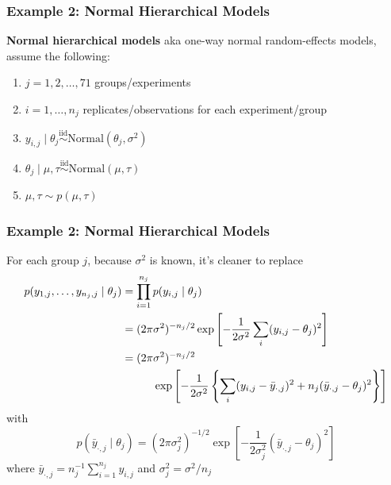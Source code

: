 \documentclass{beamer}
\begin{document}
\begin{frame}
\frametitle{Example 2: Normal Hierarchical Models  }

{\bf Normal hierarchical models} aka one-way normal random-effects models, assume the following:
\begin{enumerate}
\item $j=1,2,\ldots,71$ groups/experiments
\item $i=1, \ldots, n_j$ replicates/observations for each experiment/group
\item $y_{i,j} \mid \theta_j \overset{\text{iid}}{\sim} \text{Normal}(\theta_j, \sigma^2)$ 
\item $\theta_j \mid \mu, \tau \overset{\text{iid}}{\sim} \text{Normal}(\mu, \tau)$ 
\item $\mu, \tau \sim p(\mu, \tau)$
\end{enumerate}


\end{frame}

\begin{frame}
\frametitle{Example 2: Normal Hierarchical Models  }

For each group $j$, because $\sigma^2$ is known, it's cleaner to replace
\begin{align*}
p(y_{1,j}, \ldots, y_{n_j,j} \mid \theta_j) &= \prod_{i=1}^{n_j} p(y_{i,j} \mid \theta_{j}) \\
&= (2\pi\sigma^2)^{-n_j/2}\exp\left[-\frac{1}{2\sigma^2}\sum_i (y_{i,j} - \theta_j)^2 \right] \\
&= (2\pi\sigma^2)^{-n_j/2} \\
&\hspace{10mm} \exp\left[-\frac{1}{2\sigma^2}\left\{ \sum_i (y_{i,j} - \bar{y}_{\cdot,j})^2 +n_j(\bar{y}_{\cdot,j} - \theta_j)^2 \right\}\right] \\
\end{align*}
with
\[
p(\bar{y}_{\cdot,j} \mid \theta_j) = (2\pi\sigma_j^2)^{-1/2}\exp\left[-\frac{1}{2\sigma_j^2} (\bar{y}_{\cdot,j} - \theta_j)^2 \right] 
\]
where $\bar{y}_{\cdot,j} = n_j^{-1}\sum_{i=1}^{n_j}y_{i,j}$ and $\sigma^2_j = \sigma^2 / n_j$
\end{frame}
\end{document}
